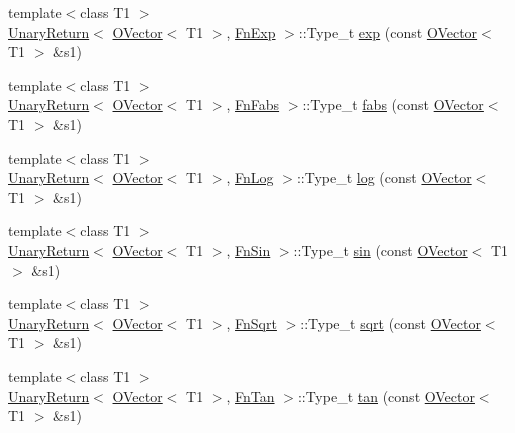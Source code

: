\begin{DoxyCompactItemize}
\item 
{\footnotesize template$<$class T1 $>$ }\\\mbox{\hyperlink{structENSEM_1_1UnaryReturn}{Unary\+Return}}$<$ \mbox{\hyperlink{classENSEM_1_1OVector}{O\+Vector}}$<$ T1 $>$, \mbox{\hyperlink{structENSEM_1_1FnExp}{Fn\+Exp}} $>$\+::Type\+\_\+t \mbox{\hyperlink{group__obsvector_gaff567614c6353e7b44ea426239a64baf}{exp}} (const \mbox{\hyperlink{classENSEM_1_1OVector}{O\+Vector}}$<$ T1 $>$ \&s1)
\item 
{\footnotesize template$<$class T1 $>$ }\\\mbox{\hyperlink{structENSEM_1_1UnaryReturn}{Unary\+Return}}$<$ \mbox{\hyperlink{classENSEM_1_1OVector}{O\+Vector}}$<$ T1 $>$, \mbox{\hyperlink{structENSEM_1_1FnFabs}{Fn\+Fabs}} $>$\+::Type\+\_\+t \mbox{\hyperlink{group__obsvector_ga0c007ded942b0d671e46d502b7de7294}{fabs}} (const \mbox{\hyperlink{classENSEM_1_1OVector}{O\+Vector}}$<$ T1 $>$ \&s1)
\item 
{\footnotesize template$<$class T1 $>$ }\\\mbox{\hyperlink{structENSEM_1_1UnaryReturn}{Unary\+Return}}$<$ \mbox{\hyperlink{classENSEM_1_1OVector}{O\+Vector}}$<$ T1 $>$, \mbox{\hyperlink{structENSEM_1_1FnLog}{Fn\+Log}} $>$\+::Type\+\_\+t \mbox{\hyperlink{group__obsvector_gaed658cf17815056e3f361233ba070ae0}{log}} (const \mbox{\hyperlink{classENSEM_1_1OVector}{O\+Vector}}$<$ T1 $>$ \&s1)
\item 
{\footnotesize template$<$class T1 $>$ }\\\mbox{\hyperlink{structENSEM_1_1UnaryReturn}{Unary\+Return}}$<$ \mbox{\hyperlink{classENSEM_1_1OVector}{O\+Vector}}$<$ T1 $>$, \mbox{\hyperlink{structENSEM_1_1FnSin}{Fn\+Sin}} $>$\+::Type\+\_\+t \mbox{\hyperlink{group__obsvector_ga3731f97921228d0d2c0ad3d05aa88985}{sin}} (const \mbox{\hyperlink{classENSEM_1_1OVector}{O\+Vector}}$<$ T1 $>$ \&s1)
\item 
{\footnotesize template$<$class T1 $>$ }\\\mbox{\hyperlink{structENSEM_1_1UnaryReturn}{Unary\+Return}}$<$ \mbox{\hyperlink{classENSEM_1_1OVector}{O\+Vector}}$<$ T1 $>$, \mbox{\hyperlink{structENSEM_1_1FnSqrt}{Fn\+Sqrt}} $>$\+::Type\+\_\+t \mbox{\hyperlink{group__obsvector_gaf293f21cc7c65ebe881f87d5214c0e60}{sqrt}} (const \mbox{\hyperlink{classENSEM_1_1OVector}{O\+Vector}}$<$ T1 $>$ \&s1)
\item 
{\footnotesize template$<$class T1 $>$ }\\\mbox{\hyperlink{structENSEM_1_1UnaryReturn}{Unary\+Return}}$<$ \mbox{\hyperlink{classENSEM_1_1OVector}{O\+Vector}}$<$ T1 $>$, \mbox{\hyperlink{structENSEM_1_1FnTan}{Fn\+Tan}} $>$\+::Type\+\_\+t \mbox{\hyperlink{group__obsvector_gaf380b1c371f0b85fa8b4f4e207fa15de}{tan}} (const \mbox{\hyperlink{classENSEM_1_1OVector}{O\+Vector}}$<$ T1 $>$ \&s1)

\end{DoxyCompactItemize}
